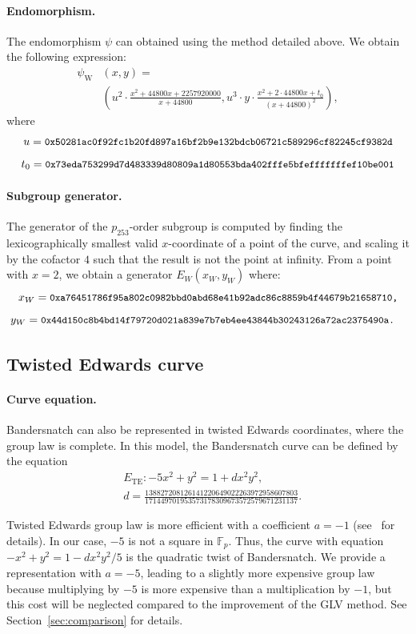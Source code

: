 \documentclass[smallextended]{svjour3}
\newcommand{\Fp}{\ensuremath{\mathbb F_p}}
\begin{document}
\paragraph{Endomorphism.}
The endomorphism $\psi$ can obtained using the method detailed above.
We obtain the following expression:
\begin{align*}
  \psi_\text{W}&(x,y) = \\
  &\left(u^2\cdot \frac{x^2+44800x+2257920000}{x+44800}, u^3\cdot
y\cdot \frac{x^2+2\cdot 44800x+t_0}{(x+44800)^2}\right),
\end{align*}
where
$$u = \text{{\small{\tt 0x50281ac0f92fc1b20fd897a16bf2b9e132bdcb06721c589296cf82245cf9382d}}}$$
$$t_0 = \text{{\small{\tt 0x73eda753299d7d483339d80809a1d80553bda402fffe5bfefffffffef10be001}}}$$

\paragraph{Subgroup generator.}
The generator of the $p_{253}$-order subgroup is computed by finding the
lexicographically smallest valid $x$-coordinate of a point of the
curve, and scaling it by the cofactor $4$ such that the result is not
the point at infinity. From a point with $x=2$, we obtain a generator $E_W(x_W,y_W)$ where:
$$x_W = \text{{\small{\tt 0xa76451786f95a802c0982bbd0abd68e41b92adc86c8859b4f44679b21658710,}}}$$
$$y_W = \text{{\small{\tt 0x44d150c8b4bd14f79720d021a839e7b7eb4ee43844b30243126a72ac2375490a.
}}}$$


\subsection{Twisted Edwards curve}
\paragraph{Curve equation.}
Bandersnatch can also be represented in twisted Edwards coordinates,
where the group law is complete.
In this model, the Bandersnatch curve can be defined by the equation
\begin{align*}
&E_\text{TE}:-5x^2+y^2 = 1 + dx^2y^2, \\
&d=\frac{138827208126141220649022263972958607803}{171449701953573178309673572579671231137}.
\end{align*}

Twisted Edwards group law is more efficient with a coefficient
$a = -1$ (see~\cite{AC:HWCD08} for details).
In our case, $-5$ is not a square in $\Fp$. Thus, the curve with
equation $-x^2+y^2 = 1 -dx^2y^2/5$ is the quadratic twist of
Bandersnatch. We provide a representation with $a=-5$, leading to a
slightly more expensive group law because multiplying by $-5$ is more
expensive than a multiplication by $-1$, but this cost will be
neglected compared to the improvement of the GLV method. See
Section~\ref{sec:comparison} for details.
\end{document}
